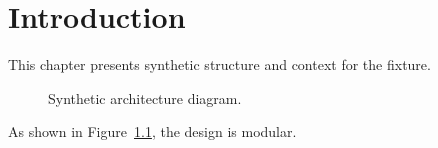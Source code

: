 \chapter{Introduction}
This chapter presents synthetic structure and context for the fixture.

\begin{figure}[h]
\centering
\fbox{\rule{0pt}{1.2in}\rule{2.0in}{0pt}}
\caption{Synthetic architecture diagram.}
\label{fig:synthetic-arch}
\end{figure}

As shown in Figure~\ref{fig:synthetic-arch}, the design is modular.

